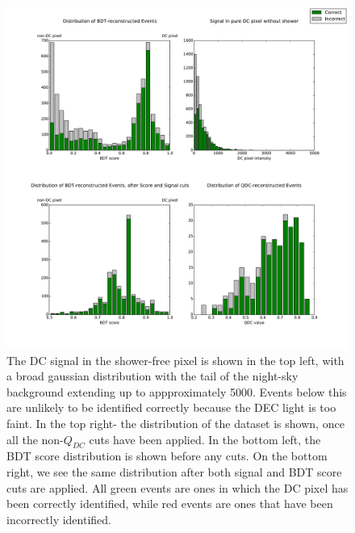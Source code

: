 \documentclass{article}
\begin{document}
\begin{figure}
\begin{center}
\includegraphics[width=\textwidth]{cutdistribution1None}
\caption{The DC signal in the shower-free pixel is shown in the top left, with a broad gaussian distribution with the tail of the night-sky background extending up to appproximately 5000. Events below this are unlikely to be identified correctly because the DEC light is too faint. In the top right- the distribution of the dataset is shown, once all the non-$Q_{DC}$ cuts have been applied. In the bottom left, the BDT score distribution is shown before any cuts. On the bottom right, we see the same distribution after both signal and BDT score cuts are applied. All green events are ones in which the DC pixel has been correctly identified, while red events are ones that have been incorrectly identified.}
\label{fig:cutdistribution}
\end{center}
\end{figure} 
\end{document}
